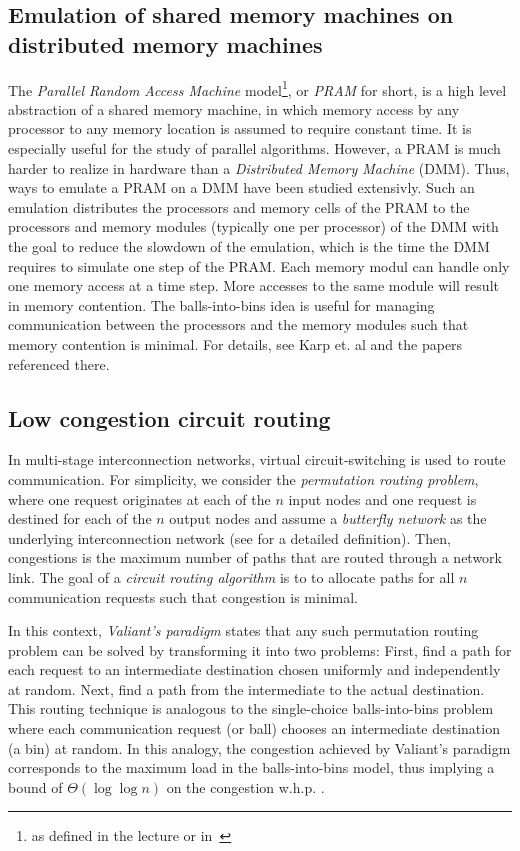 \documentclass{acm_proc_article-sp}
\begin{document}
\subsection{Emulation of shared memory machines on distributed memory machines}
\label{sec:DMM}
The \emph{Parallel Random Access Machine} model\footnote{as defined in the lecture or in~\cite{P03}}, or \emph{PRAM} for short, is a high level abstraction of a shared memory machine, in which memory access by any processor to any memory location is assumed to require constant time. It is especially useful for the study of parallel algorithms. However, a PRAM is much harder to realize in hardware than a \emph{Distributed Memory Machine} (DMM). Thus, ways to emulate a PRAM on a DMM have been studied extensivly. Such an emulation distributes the processors and memory cells of the PRAM to the processors and memory modules (typically one per processor) of the DMM with the goal to reduce the slowdown of the emulation, which is the time the DMM requires to simulate one step of the PRAM. Each memory modul can handle only one memory access at a time step. More accesses to the same module will result in memory contention. The balls-into-bins idea is useful for managing communication between the processors and the memory modules such that memory contention is minimal. For details, see Karp et. al \cite{KLM92} and the papers referenced there. 
 
\subsection{Low congestion circuit routing}
\label{sec:circuitrouting}
In multi-stage interconnection networks, virtual circuit-switching is used to route communication. For simplicity, we consider the \emph{permutation routing problem}, where one request originates at each of the $n$ input nodes and one request is destined for each of the $n$ output nodes and assume a \emph{butterfly network} as the underlying interconnection network (see \cite{CLR09} for a detailed definition). Then, congestions is the maximum number of paths that are routed through a network link. The goal of a \emph{circuit routing algorithm} is to to allocate paths for all $n$ communication requests such that congestion is minimal.

In this context, \emph{Valiant's paradigm} \cite{V82} states that any such permutation routing problem can be solved by transforming it into two problems: First, find a path for each request to an intermediate destination chosen uniformly and independently at random. Next, find a path from the intermediate to the actual destination. This routing technique is analogous to the single-choice balls-into-bins problem where each communication request (or ball) chooses an intermediate destination (a bin) at random. In this analogy, the congestion achieved by Valiant's paradigm corresponds to the maximum load in the balls-into-bins model, thus implying a bound of $\Theta\left(\log \log n\right)$ on the congestion w.h.p. \cite{CMM+98} \cite{MRS01}. 
\end{document}
